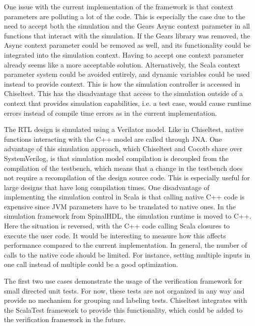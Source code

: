 One issue with the current implementation of the framework is that context parameters are polluting a lot of the code. This is especially the case due to the need to accept both the simulation and the Gears Async context parameter in all functions that interact with the simulation. If the Gears library was removed, the Async context parameter could be removed as well, and its functionality could be integrated into the simulation context. Having to accept one context parameter already seems like a more acceptable solution. Alternatively, the Scala context parameter system could be avoided entirely, and dynamic variables could be used instead to provide context. This is how the simulation controller is accessed in Chiseltest. This has the disadvantage that access to the simulation outside of a context that provides simulation capabilities, i.e. a test case, would cause runtime errors instead of compile time errors as in the current implementation. 

The RTL design is simulated using a Verilator model. Like in Chiseltest, native functions interacting with the C++ model are called through JNA. One advantage of this simulation approach, which Chiseltest and Cocotb share over SystemVerilog, is that simulation model compilation is decoupled from the compilation of the testbench, which means that a change in the testbench does not require a recompilation of the design source code. This is especially useful for large designs that have long compilation times. One disadvantage of implementing the simulation control in Scala is that calling native C++ code is expensive since JVM parameters have to be translated to native ones. In the simulation framework from SpinalHDL, the simulation runtime is moved to C++. Here the situation is reversed, with the C++ code calling Scala closures to execute the user code. It would be interesting to measure how this affects performance compared to the current implementation. In general, the number of calls to the native code should be limited. For instance, setting multiple inputs in one call instead of multiple could be a good optimization.

The first two use cases demonstrate the usage of the verification framework for small directed unit tests. For now, these tests are not organized in any way and provide no mechanism for grouping and labeling tests. Chiseltest integrates with the ScalaTest framework to provide this functionality, which could be added to the verification framework in the future.

